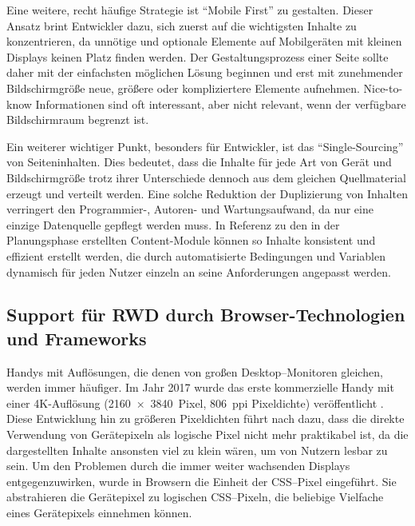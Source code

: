 Eine weitere, recht häufige Strategie ist "`Mobile First"' \autocite{Wroblewski.MobileFirst.2009} zu gestalten.
Dieser Ansatz brint Entwickler dazu, sich zuerst auf die wichtigsten Inhalte zu konzentrieren, da unnötige und optionale Elemente auf Mobilgeräten mit kleinen Displays keinen Platz finden werden.
Der Gestaltungsprozess einer Seite sollte daher mit der einfachsten möglichen Lösung beginnen und erst mit zunehmender Bildschirmgröße neue, größere oder kompliziertere Elemente aufnehmen.
Nice-to-know Informationen sind oft interessant, aber nicht relevant, wenn der verfügbare Bildschirmraum begrenzt ist.

Ein weiterer wichtiger Punkt, besonders für Entwickler, ist das "`Single-Sourcing"' \autocite[S. 3--4]{Katajisto.CreatingSupportContent.2015} von Seiteninhalten.
Dies bedeutet, dass die Inhalte für jede Art von Gerät und Bildschirmgröße trotz ihrer Unterschiede dennoch aus dem gleichen Quellmaterial erzeugt und verteilt werden.
Eine solche Reduktion der Duplizierung von Inhalten verringert den Programmier-, Autoren- und Wartungsaufwand, da nur eine einzige Datenquelle gepflegt werden muss.
In Referenz zu den in der Planungsphase erstellten Content-Module können so Inhalte konsistent und effizient erstellt werden, die durch automatisierte Bedingungen und Variablen dynamisch für jeden Nutzer einzeln an seine Anforderungen angepasst werden.


\subsection{Support für \ac{RWD} durch Browser-Technologien und Frameworks}

Handys mit Auflösungen, die denen von großen Desktop--Monitoren gleichen, werden immer häufiger.
Im Jahr 2017 wurde das erste kommerzielle Handy mit einer 4K-Auflösung (2160 × 3840 Pixel, 806 ppi Pixeldichte) veröffentlicht \autocite{Wikipedia.SonyXperiaZ5Premium.2024}.
Diese Entwicklung hin zu größeren Pixeldichten führt nach \autocite{Harmsen.2018} dazu, dass die direkte Verwendung von Gerätepixeln als logische Pixel nicht mehr praktikabel ist, da die dargestellten Inhalte ansonsten viel zu klein wären, um von Nutzern lesbar zu sein.
Um den Problemen durch die immer weiter wachsenden Displays entgegenzuwirken, wurde in Browsern die Einheit der \acs{CSS}--Pixel eingeführt.
Sie abstrahieren die Gerätepixel zu logischen \acs{CSS}--Pixeln, die beliebige Vielfache eines Gerätepixels einnehmen können.

